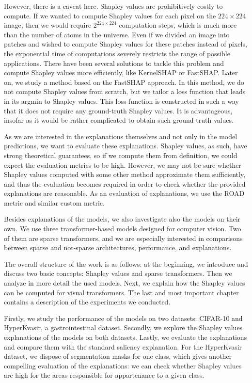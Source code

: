 \documentclass[magisterska,en]{pracamgr}
\begin{document}
However, there is a caveat here. Shapley values are prohibitively costly to compute. If we wanted to compute Shapley values for each pixel on the $224 \times 224$ image, then we would require $2^{224\times 224}$ computation steps, which is much more than the number of atoms in the universe. Even if we divided an image into patches and wished to compute Shapley values for these patches instead of pixels, the exponential time of computations severely restricts the range of possible applications.
There have been several solutions to tackle this problem and compute Shapley values more efficiently, like KernelSHAP or FastSHAP. Later on, we study a method based on the FastSHAP approach. In this method, we do not compute Shapley values from scratch, but we tailor a loss function that leads in its argmin to Shapley values. This loss function is constructed in such a way that it does not require any ground-truth Shapley values. It is advantageous, insofar as it would be rather complicated to obtain such ground-truth values. 

As we are interested in the explanations themselves and not only in the model predictions, we want to evaluate these explanations. Shapley values, as such, have strong theoretical guarantees, so if we compute them from definition, we could expect the evaluation metrics to be high. However, we may not be sure whether Shapley values computed with some other method approximate them sufficiently, and thus the evaluation becomes required in order to check whether the provided explanations are reasonable. As an evaluation of explanations, we use the ROAD metric and similar custom metric.


Besides explanations of the models, we also investigate also the models on their own. We use three transformer-based models designed for computer vision. Two of them are sparse transformers, and we are especially interested in comparisons between sparse and not-sparse architectures, performance, and explanations.


The overall structure of the work is as follows: at the beginning, we introduce and discuss two basic concepts: Shapley values and sparse transformers. Then we analyze in more detail the used models. Next, we explain how the Shapley values can be computed for visual transformers. The last and most important chapter contains a description of the experiments we conducted. 


Firstly, we study the performance of the models on two datasets: CIFAR-10 and HyperKvasir, a gastrointestinal dataset. Secondly, we explore the Shapley values explanations of the models on both datasets. Lastly, we evaluate  the explanations and compare them with the standard saliency explanation. For the HyperKvasir dataset, we dispose of segmentation masks for one class, which gives another compelling evaluation of the explanations: we can check whether Shapley values are high for the areas responsible for appartenance to a given class. 
\end{document}
